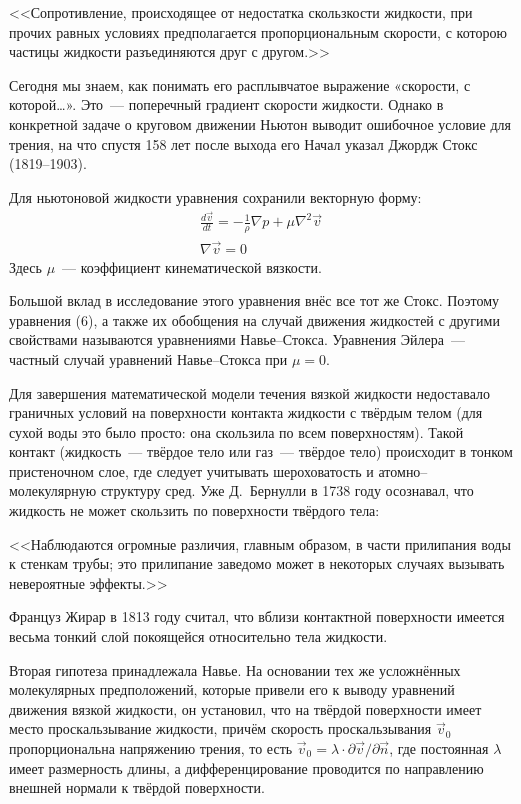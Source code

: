<<Сопротивление, происходящее от недостатка скользкости жидкости, при прочих равных условиях предполагается 
пропорциональным скорости, с которою частицы жидкости разъединяются друг с другом.>>

Сегодня мы знаем, как понимать его расплывчатое выражение «скорости, с которой…». Это~--- поперечный градиент 
скорости жидкости. Однако в конкретной задаче о круговом движении Ньютон выводит ошибочное условие для трения, 
на что спустя 158 лет после выхода его Начал указал Джордж Стокс (1819--1903).

Для ньютоновой жидкости уравнения сохранили векторную форму:
\begin{gather}
\frac{d \vec v}{d t} = - \frac{1}{\rho} \nabla p + \mu \nabla^2 \vec v \\
\nabla \vec v = 0
\label{6}
\end{gather}
Здесь $\mu$~--- коэффициент кинематической вязкости.

Большой вклад в исследование этого уравнения внёс все тот же Стокс. Поэтому уравнения (6), а также их 
обобщения на случай движения жидкостей с другими свойствами называются уравнениями Навье--Стокса. Уравнения 
Эйлера~--- частный случай уравнений Навье--Стокса при $\mu=0$.

Для завершения математической модели течения вязкой жидкости недоставало граничных условий на поверхности 
контакта жидкости с твёрдым телом (для сухой воды это было просто: она скользила по всем поверхностям). 
Такой контакт (жидкость~--- твёрдое тело или газ~--- твёрдое тело) происходит в тонком пристеночном слое, 
где следует учитывать шероховатость и атомно--молекулярную структуру сред. Уже Д.~Бернулли в 1738 году 
осознавал, что жидкость не может скользить по поверхности твёрдого тела:

<<Наблюдаются огромные различия, главным образом, в части прилипания воды к стенкам трубы; это прилипание 
заведомо может в некоторых случаях вызывать невероятные эффекты.>>

Француз Жирар в 1813 году считал, что вблизи контактной поверхности имеется весьма тонкий слой покоящейся 
относительно тела жидкости.

Вторая гипотеза принадлежала Навье. На основании тех же усложнённых молекулярных предположений, которые 
привели его к выводу уравнений движения вязкой жидкости, он установил, что на твёрдой поверхности имеет 
место проскальзывание жидкости, причём скорость проскальзывания $\vec{v}_0$ пропорциональна напряжению 
трения, то есть $\vec{v}_0=\lambda \cdot \partial \vec v / \partial \vec n$, где постоянная $\lambda$ 
имеет размерность длины, а дифференцирование проводится по направлению внешней нормали к твёрдой поверхности.


